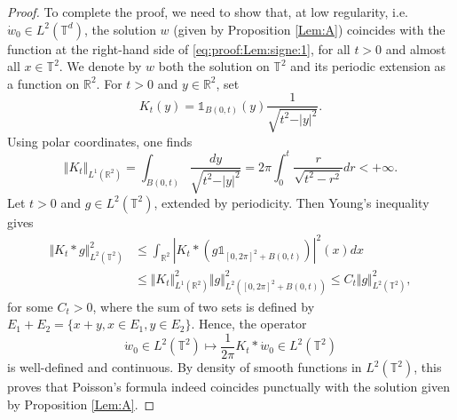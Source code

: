 \documentclass[a4paper]{article}
\theoremstyle{plain}
\newcommand{\T}{\mathbb{T}}
\begin{document}
\begin{proof}
To complete the proof, we need to show that, at low regularity, i.e. $\dot{w}_0 \in L^2(\T^d)$, the solution $w$ (given by Proposition \ref{Lem:A}) coincides with the function at the right-hand side of \eqref{eq:proof:Lem:signe:1}, for all $t > 0$ and almost all $x \in \mathbb{T}^2$. We denote by $w$ both the solution on $\mathbb{T}^2$ and its periodic extension as a function on $\mathbb{R}^2$. For $t > 0$ and $y \in \mathbb{R}^2$, set 
\begin{equation*}
    K_t(y) = \mathbb{1}_{B(0,t)}(y) \frac{1}{\sqrt{t^2 - \vert y \vert^2}}.
\end{equation*}
Using polar coordinates, one finds
\begin{equation*}
    \Vert K_t \Vert_{L^1(\mathbb{R}^2)} 
    = \int_{B(0,t)} \frac{d y}{\sqrt{t^2 - \vert y \vert^2}} 
    = 2 \pi \int_0^t \frac{r}{\sqrt{t^2 - r^2}} d r 
    < + \infty.
\end{equation*}
Let $t > 0$ and $g \in L^2(\mathbb{T}^2)$, extended by periodicity. Then Young's inequality gives
\begin{align*}
    \Vert K_t \ast g \Vert_{L^2(\mathbb{T}^2)}^2 
    & \leq \int_{\mathbb{R}^2} \left\vert K_t \ast \left( g \mathbb{1}_{[0, 2\pi]^2 + B(0,t)} \right) \right\vert^2(x) d x \\
    & \leq \Vert K_t \Vert_{L^1(\mathbb{R}^2)}^2 \Vert g \Vert_{L^2([0, 2\pi]^2 + B(0,t))}^2 
    \leq C_t \Vert g \Vert_{L^2(\mathbb{T}^2)}^2,
\end{align*}
for some $C_t > 0$, where the sum of two sets is defined by $E_1 + E_2 = \{x+y, x \in E_1, y \in E_2\}$. Hence, the operator 
\begin{equation*}
    \dot{w}_0 \in L^2(\mathbb{T}^2) \longmapsto \frac{1}{2 \pi} K_t \ast \dot{w}_0 \in L^2(\mathbb{T}^2)
\end{equation*}
is well-defined and continuous. By density of smooth functions in $L^2(\mathbb{T}^2)$, this proves that Poisson's formula
indeed coincides punctually with the solution given by Proposition \ref{Lem:A}.
\end{proof}
\end{document}
